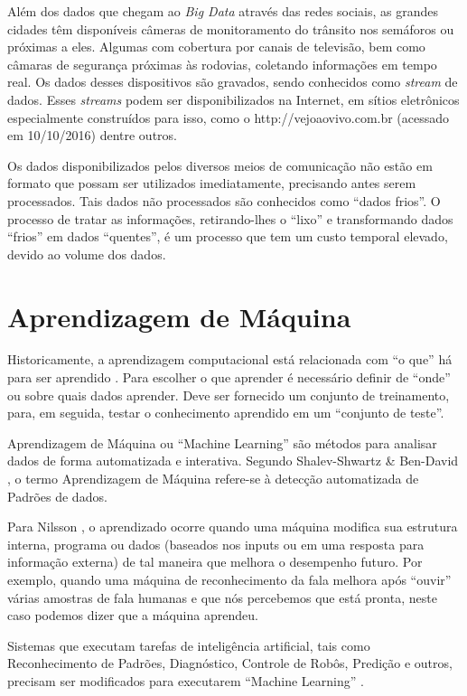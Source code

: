 Além dos dados que chegam ao \textit{Big Data} através das redes sociais, as grandes cidades têm disponíveis câmeras de monitoramento do trânsito nos semáforos ou próximas a eles. Algumas com cobertura por canais de televisão, bem como câmaras de segurança próximas às rodovias, coletando informações em tempo real. Os dados desses dispositivos são gravados, sendo conhecidos como \textit{stream} de dados. Esses \textit{streams} podem ser disponibilizados na Internet, em sítios eletrônicos especialmente construídos para isso, como o http://vejoaovivo.com.br (acessado em 10/10/2016) dentre outros.

Os dados disponibilizados pelos diversos meios de comunicação não estão em formato que possam ser utilizados imediatamente, precisando antes serem processados. Tais dados não processados são conhecidos como ``dados frios''. O processo de tratar as informações, retirando-lhes o ``lixo'' e transformando dados ``frios'' em dados ``quentes'', é um processo que tem um custo temporal elevado, devido ao volume dos dados.


\section{Aprendizagem de Máquina} \label{arte:palavraChave:Machine}

Historicamente, a aprendizagem computacional está relacionada com ``o que'' há para ser aprendido \cite{Nilsson2005}. 
Para escolher o que aprender é necessário definir de ``onde'' ou sobre quais dados aprender.
Deve ser fornecido um conjunto de treinamento, para, em seguida, testar o conhecimento aprendido em um ``conjunto de teste''.

Aprendizagem de Máquina ou ``Machine Learning'' são métodos para analisar dados de forma automatizada e interativa.
Segundo Shalev-Shwartz \& Ben-David \cite{Ben-David2014}, o termo Aprendizagem de Máquina refere-se à detecção automatizada de Padrões de dados.

Para Nilsson \cite{Nilsson2005}, o aprendizado ocorre quando uma máquina modifica sua estrutura interna, programa ou dados 
(baseados nos inputs ou em uma resposta para informação externa) de tal maneira que melhora o desempenho futuro. Por exemplo, quando uma máquina de reconhecimento da fala melhora após ``ouvir'' várias amostras de fala humanas e que nós percebemos que está pronta, neste caso podemos dizer que a máquina aprendeu.

Sistemas que executam tarefas de inteligência artificial, tais como Reconhecimento de Padrões, Diagnóstico, Controle de Robôs, Predição e outros, precisam ser modificados para executarem ``Machine Learning'' \cite{Nilsson2005}.


